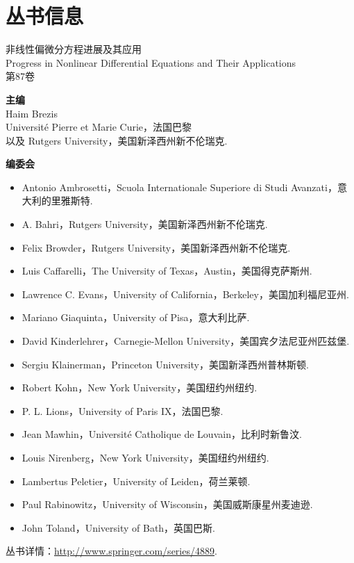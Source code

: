 \section*{丛书信息}
\begin{center}\large 非线性偏微分方程进展及其应用\\Progress in Nonlinear Differential Equations and Their Applications\\第87卷\end{center}
\noindent\textbf{主编}\\Haim Brezis\\Université Pierre et Marie Curie，法国巴黎\\以及 Rutgers University，美国新泽西州新不伦瑞克.

\noindent\textbf{编委会}
\begin{small}\begin{itemize}
\item Antonio Ambrosetti，Scuola Internationale Superiore di Studi Avanzati，意大利的里雅斯特.
\item A. Bahri，Rutgers University，美国新泽西州新不伦瑞克.
\item Felix Browder，Rutgers University，美国新泽西州新不伦瑞克.
\item Luis Caffarelli，The University of Texas，Austin，美国得克萨斯州.
\item Lawrence C. Evans，University of California，Berkeley，美国加利福尼亚州.
\item Mariano Giaquinta，University of Pisa，意大利比萨.
\item David Kinderlehrer，Carnegie-Mellon University，美国宾夕法尼亚州匹兹堡.
\item Sergiu Klainerman，Princeton University，美国新泽西州普林斯顿.
\item Robert Kohn，New York University，美国纽约州纽约.
\item P. L. Lions，University of Paris IX，法国巴黎.
\item Jean Mawhin，Université Catholique de Louvain，比利时新鲁汶.
\item Louis Nirenberg，New York University，美国纽约州纽约.
\item Lambertus Peletier，University of Leiden，荷兰莱顿.
\item Paul Rabinowitz，University of Wisconsin，美国威斯康星州麦迪逊.
\item John Toland，University of Bath，英国巴斯.
\end{itemize}\end{small}
丛书详情：\url{http://www.springer.com/series/4889}.
\clearpage
